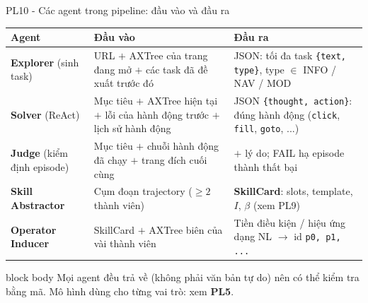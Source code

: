 \begin{frame}{PL10 - Các agent trong pipeline: đầu vào và đầu ra}
  \centering
  \tsep
  \scriptsize
  \begin{tabular}{@{}L{2.5cm} L{5.5cm} L{5.3cm}@{}}
    \toprule
    \textbf{Agent} & \textbf{Đầu vào} & \textbf{Đầu ra} \\
    \midrule
    \textbf{Explorer} \newline (sinh task) & URL $+$ AXTree của trang đang mở $+$ các task đã đề xuất trước đó & JSON: tối đa  task \texttt{\{text, type\}}, type $\in$ INFO / NAV / MOD \\
    \midrule
    \textbf{Solver} \newline (ReAct) & Mục tiêu $+$ AXTree hiện tại $+$ lỗi của hành động trước $+$ lịch sử hành động & JSON \texttt{\{thought, action\}}: đúng  hành động (\texttt{click}, \texttt{fill}, \texttt{goto}, ...) \\
    \midrule
    \textbf{Judge} \newline (kiểm định episode) & Mục tiêu $+$ chuỗi hành động đã chạy $+$ trang đích cuối cùng &  $+$ lý do; FAIL hạ episode thành thất bại \\
    \midrule
    \textbf{Skill Abstractor} & Cụm đoạn trajectory ($\ge 2$ thành viên) & \textbf{SkillCard}: slots, template, $I$, $\beta$ (xem PL9) \\
    \midrule
    \textbf{Operator Inducer} & SkillCard $+$ AXTree biên của vài thành viên & Tiền điều kiện / hiệu ứng dạng NL $\rightarrow$ id \texttt{p0, p1, ...} \\
    \bottomrule
  \end{tabular}

  \vspace{0.15cm}
  \begin{beamercolorbox}[wd=\textwidth,sep=2.5pt,leftskip=6pt,rightskip=6pt,rounded=true]{block body}
    \scriptsize Mọi agent đều trả về  (không phải văn bản tự do) nên có thể kiểm tra bằng mã. Mô hình dùng cho từng vai trò: xem \textbf{PL5}.
  \end{beamercolorbox}
\end{frame}

